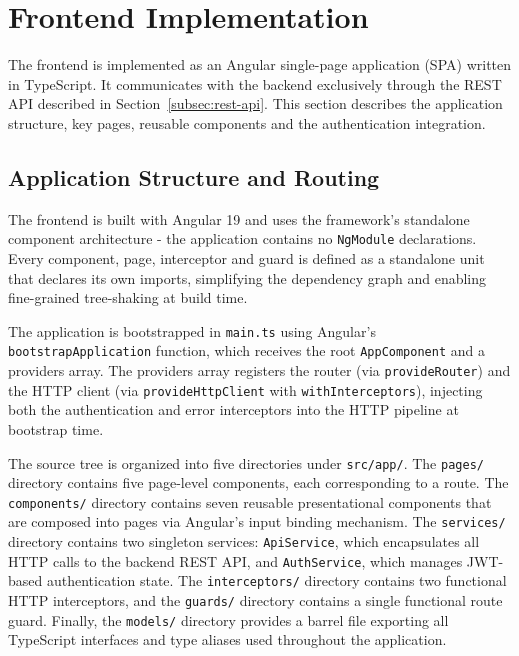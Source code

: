 \section{Frontend Implementation}
\label{sec:frontend-impl}

\par The frontend is implemented as an Angular single-page application (SPA) written in TypeScript. It communicates with the backend exclusively through the REST API described in Section~\ref{subsec:rest-api}. This section describes the application structure, key pages, reusable components and the authentication integration.

\subsection{Application Structure and Routing}
\label{subsec:frontend-structure}

\par The frontend is built with Angular 19 and uses the framework's standalone component architecture - the application contains no \texttt{NgModule} declarations. Every component, page, interceptor and guard is defined as a standalone unit that declares its own imports, simplifying the dependency graph and enabling fine-grained tree-shaking at build time.

The application is bootstrapped in \texttt{main.ts} using Angular's \texttt{bootstrapA\-ppli\-ca\-tion} function, which receives the root \texttt{AppComponent} and a providers array. The providers array registers the router (via \texttt{provideRouter}) and the HTTP client (via \texttt{pro\-vid\-eHttp\-Client} with \texttt{withInterceptors}), injecting both the authentication and error interceptors into the HTTP pipeline at bootstrap time.

The source tree is organized into five directories under \texttt{src/app/}. The \texttt{pages/} directory contains five page-level components, each corresponding to a route. The \texttt{components/} directory contains seven reusable presentational components that are composed into pages via Angular's input binding mechanism. The \texttt{services/} directory contains two singleton services: \texttt{ApiService}, which encapsulates all HTTP calls to the backend REST API, and \texttt{AuthService}, which manages JWT-based authentication state. The \texttt{interceptors/} directory contains two functional HTTP interceptors, and the \texttt{guards/} directory contains a single functional route guard. Finally, the \texttt{models/} directory provides a barrel file exporting all TypeScript interfaces and type aliases used throughout the application.

